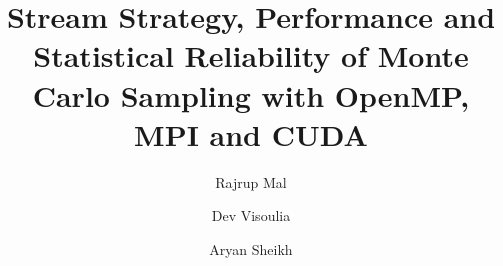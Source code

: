 \documentclass[runningheads]{llncs}
\begin{document}
\title{Stream Strategy, Performance and Statistical Reliability of Monte Carlo Sampling with OpenMP, MPI and CUDA}
\author{Rajrup Mal \and Dev Visoulia \and Aryan Sheikh}
\maketitle
\begin{abstract}

\end{abstract}



\end{document}

